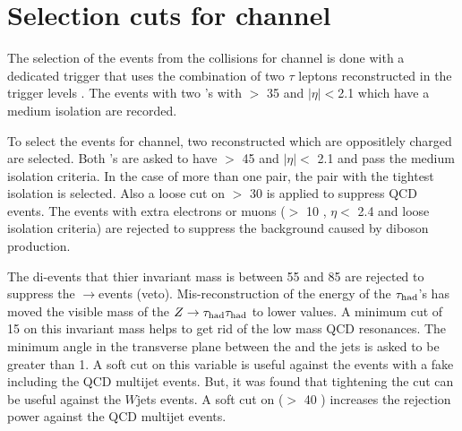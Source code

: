 \section{\texorpdfstring{Selection cuts for \Tau\Tau channel}{Selection cuts for tau-tau channel}}
\label{sect:tauTauCuts}
The selection of the events from the collisions for \Tau\Tau channel
is done with a dedicated trigger that uses the combination of 
two $\tau$ leptons reconstructed in the trigger levels \cite{CMS:2013hoa,Chatrchyan:2012xi,Chatrchyan:2011nv}.
The events with two \Tau's with \PT $>$ 35 \GeV and $|\eta|<$2.1 which have a medium isolation are recorded. 

To select the events for \Tau\Tau channel, two reconstructed \Tau which are oppositlely charged are selected. Both \Tau's are asked to 
have \PT $>$ 45 \GeV and $|\eta| <$ 2.1 and pass the medium isolation criteria.
In the case of more than one pair, the pair with the tightest isolation 
is selected. Also a loose cut on \MET $>$ 30 \GeV is applied to suppress QCD events.
The events with extra electrons or muons (\PT $>$ 10 \GeV, $\eta <$ 2.4 and loose isolation criteria) 
are rejected to suppress %
the background caused by diboson production.

The di-\Tau events that thier invariant mass is between 55 and 85 \GeV are rejected to suppress the \Z$\rightarrow$\Tau\Tau events (\Z veto).
Mis-reconstruction of the energy of the $\tau_{\rm had}$'s has moved the visible mass of the $Z\to\tau_{\rm had}\tau_{\rm had}$ to lower values.
A minimum cut of 15 \GeV on this invariant mass helps to get rid of the low mass
QCD resonances. The minimum angle in the transverse plane between the \MET and the jets %
is asked to be greater than 1. A soft cut on this variable is useful against the events with a fake \MET including the QCD multijet events. 
But, it was found that tightening the cut can be useful against the $W$jets events.
A soft cut on \mttwo ($>$ 40 \GeV) increases the rejection power against the QCD multijet events.

